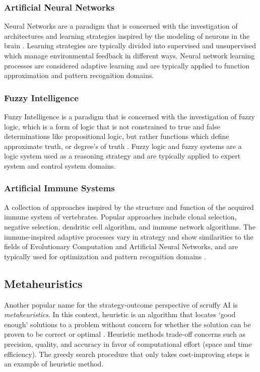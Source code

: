 \begin{bibunit}
\subsubsection{Artificial Neural Networks}
Neural Networks are a paradigm that is concerned with the investigation of architectures and learning strategies inspired by the modeling of neurons in the brain \cite{Bishop1995}. Learning strategies are typically divided into supervised and unsupervised which manage environmental feedback in different ways. Neural network learning processes are considered adaptive learning and are typically applied to function approximation and pattern recognition domains.

\subsubsection{Fuzzy Intelligence}
Fuzzy Intelligence is a paradigm that is concerned with the investigation of fuzzy logic, which is a form of logic that is not constrained to true and false determinations like propositional logic, but rather functions which define approximate truth, or degree’s of truth \cite{Zadeh1996}. Fuzzy logic and fuzzy systems are a logic system used as a reasoning strategy and are typically applied to expert system and control system domains.

\subsubsection{Artificial Immune Systems}
A collection of approaches inspired by the structure and function of the acquired immune system of vertebrates. Popular approaches include clonal selection, negative selection, dendritic cell algorithm, and immune network algorithms. The immune-inspired adaptive processes vary in strategy and show similarities to the fields of Evolutionary Computation and Artificial Neural Networks, and are typically used for optimization and pattern recognition domains \cite{Castro2002}.  

% 
% 
\subsection{Metaheuristics}
\label{sec:metaheuristics}
Another popular name for the strategy-outcome perspective of scruffy AI is \emph{metaheuristics}. 
In this context, heuristic is an algorithm that locates `good enough' solutions to a problem without concern for whether the solution can be proven to be correct or optimal \cite{Michalewicz2004}. Heuristic methods trade-off concerns such as precision, quality, and accuracy in favor of computational effort (space and time efficiency). The greedy search procedure that only takes cost-improving steps is an example of heuristic method.


\end{bibunit}
